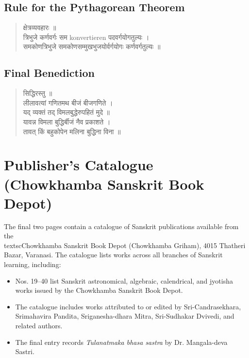 \documentclass[11pt,a4paper]{article}
\newcommand{\dev}[1]{{\devanagarifont #1}}
\newenvironment{sanskritverse}{%
  \begin{verse}
}{%
  \end{verse}
}
\begin{document}
\subsection*{Rule for the Pythagorean Theorem}

\begin{sanskritverse}
\dev{%
क्षेत्रव्यवहारः ॥\\[0.5em]
त्रिभुजे कर्णवर्गः सम konvertieren पदवर्गयोगतुल्यः ।\\
समकोणत्रिभुजे समकोणसम्मुखभुजयोर्वर्गयोगः कर्णवर्गतुल्यः ॥}
\end{sanskritverse}

\subsection*{Final Benediction}

\begin{sanskritverse}
\dev{%
सिद्धिरस्तु ॥\\[0.5em]
लीलावत्यां गणितमथ बीजं बीजगणिते ।\\
यद् व्यक्तं तद् विमलबुद्धेरुपहितं मुदे ॥\\[0.5em]
यावन्न विमला बुद्धिर्बीजं नैव प्रकाशते ।\\
तावत् किं बहुकोपेन मलिना बुद्धिना विना ॥}
\end{sanskritverse}

\newpage

\section*{Publisher's Catalogue (Chowkhamba Sanskrit Book Depot)}

The final two pages contain a catalogue of Sanskrit publications available from the \\textsc{Chowkhamba Sanskrit Book Depot} (Chowkhamba Griham), 4015 Thatheri Bazar, Varanasi. The catalogue lists works across all branches of Sanskrit learning, including:

\begin{itemize}[leftmargin=2em]
\item Nos. 19--40 list Sanskrit astronomical, algebraic, calendrical, and jyotisha works issued by the Chowkhamba Sanskrit Book Depot.
\item The catalogue includes works attributed to or edited by Sri-Candrasekhara, Srimahavira Pandita, Sriganesha-dhara Mitra, Sri-Sudhakar Dvivedi, and related authors.
\item The final entry records \textit{Tulanatmaka bhasa sastra} by Dr. Mangala-deva Sastri.
\end{itemize}
\end{document}
